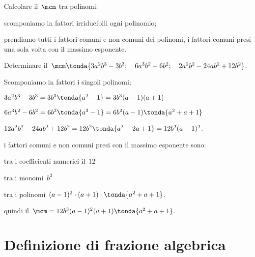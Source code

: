 \begin{procedura}
Calcolare il~\(\mcm\) tra polinomi:
\begin{enumeratea}
\item scomponiamo in fattori irriducibili ogni polinomio;
\item prendiamo tutti i fattori comuni e non comuni dei polinomi, i fattori 
 comuni presi una sola volta con il massimo esponente.
\end{enumeratea}
\end{procedura}

 \begin{esempio}
Determinare il~\(\mcm \tonda{3a^{2}b^{3}-3b^{3};\quad 6a^{3}b^{2}-6b^{2};
                      \quad 2a^{2}b^{2}-24ab^{2}+12b^{2}} \).
 \begin{itemize*}
 \item Scomponiamo in fattori i singoli polinomi;
  \begin{itemize*}
  \item \(3a^{2}b^{3}-3b^{3}=3b^{3} \tonda{a^{2}-1} =3b^{3}(a-1)(a+1)\)
  \item \(6a^{3}b^{2}-6b^{2}=6b^{2} \tonda{a^{3}-1} =
         6b^{2}(a-1) \tonda{a^{2}+a+1} \)
  \item \(12a^{2}b^{2}-24ab^{2}+12b^{2}=12b^{2} \tonda{a^{2}-2a+1} =
         12b^{2}(a-1)^{2}\).
  \end{itemize*}
 \item i fattori comuni e non comuni presi con il massimo esponente sono:
  \begin{itemize*}
  \item tra i coefficienti numerici il~\(12\)
  \item tra i monomi~\(b^{3}\)
  \item tra i polinomi~\((a-1)^{2}\cdot (a+1)\cdot  \tonda{a^{2}+a+1} \).
  \end{itemize*}
 \item quindi il~\(\mcm=12b^{3}(a-1)^{2}(a+1) \tonda{a^{2}+a+1} \).
 \end{itemize*}
 \end{esempio}


\section{Definizione di frazione algebrica}
\label{sec:frazalg_definizione}

